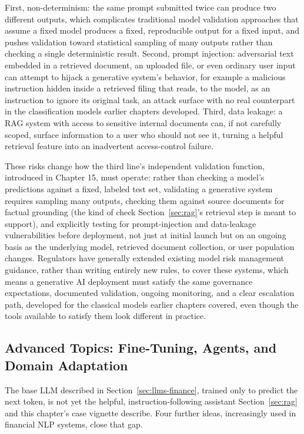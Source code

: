 \documentclass[../ai_in_finance]{subfiles}
\begin{document}
First, non-determinism: the same prompt submitted twice can produce two different outputs, which complicates traditional model validation approaches that assume a fixed model produces a fixed, reproducible output for a fixed input, and pushes validation toward statistical sampling of many outputs rather than checking a single deterministic result. Second, prompt injection: adversarial text embedded in a retrieved document, an uploaded file, or even ordinary user input can attempt to hijack a generative system's behavior, for example a malicious instruction hidden inside a retrieved filing that reads, to the model, as an instruction to ignore its original task, an attack surface with no real counterpart in the classification models earlier chapters developed. Third, data leakage: a RAG system with access to sensitive internal documents can, if not carefully scoped, surface information to a user who should not see it, turning a helpful retrieval feature into an inadvertent access-control failure.

These risks change how the third line's independent validation function, introduced in Chapter 15, must operate: rather than checking a model's predictions against a fixed, labeled test set, validating a generative system requires sampling many outputs, checking them against source documents for factual grounding (the kind of check Section~\ref{sec:rag}'s retrieval step is meant to support), and explicitly testing for prompt-injection and data-leakage vulnerabilities before deployment, not just at initial launch but on an ongoing basis as the underlying model, retrieved document collection, or user population changes. Regulators have generally extended existing model risk management guidance, rather than writing entirely new rules, to cover these systems, which means a generative AI deployment must satisfy the same governance expectations, documented validation, ongoing monitoring, and a clear escalation path, developed for the classical models earlier chapters covered, even though the tools available to satisfy them look different in practice.

\subsection{Advanced Topics: Fine-Tuning, Agents, and Domain Adaptation}
\label{sec:advanced-nlp}

The base LLM described in Section~\ref{sec:llms-finance}, trained only to predict the next token, is not yet the helpful, instruction-following assistant Section~\ref{sec:rag} and this chapter's case vignette describe. Four further ideas, increasingly used in financial NLP systems, close that gap.
\end{document}
